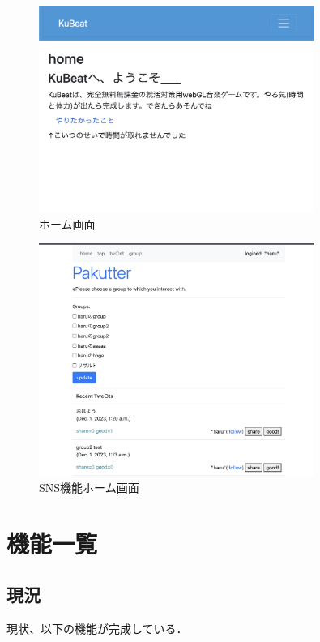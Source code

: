 \documentclass[a4j]{jarticle}
\begin{document}
\begin{figure}[htbp]
  \centering
  \includegraphics[width=0.8\textwidth,bb=0 0 800 600]{img/home.jpg}
  \caption{ホーム画面}
\end{figure}
\begin{figure}[htbp]
  \centering
  \includegraphics[width=0.8\textwidth,bb=0 0 800 600]{img/twitterhome.jpg}
  \caption{SNS機能ホーム画面}
\end{figure}
\section{機能一覧}
\subsection{現況}  
現状、以下の機能が完成している．
\end{document}
